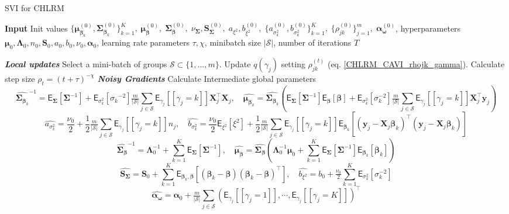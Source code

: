 \begin{algorithm}[H]
\scriptsize 
\caption{SVI for CHLRM}
\label{SVI_CHLRM_alg}
\begin{algorithmic}
\State \textbf{Input} Init values $
\{\bm{\mu}_{\bm{\beta}_k}^{(0)},\bm{\Sigma}_{\bm{\beta}_k}^{(0)}\}_{k=1}^K,\;
\bm{\mu}_{\bm{\beta}}^{(0)},\;\bm{\Sigma}_{\bm{\beta}}^{(0)},\;
\nu_{\bm{\Sigma}},\bm{S}_{\bm{\Sigma}}^{(0)},\;
a_{\xi^2}, b_{\xi^2}^{(0)},\;
\{a_{\sigma_k^2}^{(0)}, b_{\sigma_k^2}^{(0)}\}_{k=1}^K,\;
\{\rho_{jk}^{(0)}\}_{j=1}^m,\;
\bm{\alpha}^{(0)}_{\bm{\omega}}$, hyperparameters $\bm{\mu}_0,\bm{\Lambda}_0,n_0,\bm{S}_0,a_0,b_0,\nu_0,\bm{\alpha}_0$, learning rate parameters $\tau,\chi$, minibatch size $|\mathcal{S}|$, number of iterations $T$

\State \textbf{\textit{Local updates}}
  \State Select a mini-batch of groups $\mathcal{S} \subset \{1,\dots,m\}$.
    \State Update $q(\gamma_j)$ setting $\rho_{jk}^{(t)}$ (eq. \ref{CHLRM_CAVI_rhojk_gamma}).
  \EndFor
  \State  Calculate step size  $\rho_t = (t+\tau)^{-\chi}$
  \State \textbf{\textit{Noisy Gradients}}
  \State Calculate Intermediate global parameters
  $$
    \hat{\bm{\Sigma}_{\bm{\beta}_k}}^{-1} =  \mathsf{E}_{\bm{\Sigma}}\left[\bm{\Sigma}^{-1}\right]+\mathsf{E}_{\sigma^2_k}\left[{\sigma_k}^{-2}\right] \tfrac{m}{|\mathcal{S}|}\sum_{j \in \mathcal{S}} \mathsf{E}_{\gamma_j}\left[[\gamma_j=k]\right]\bm{X}_{j}^\top \bm{X}_{j}
  ,\quad
  \hat{\bm{\mu}_{\bm{\beta}_k}} =\hat{\bm{\Sigma}_{\bm{\beta}_k}}\left(\mathsf{E}_{\bm{\Sigma}}[\bm{\Sigma}^{-1}]\mathsf{E}_{\bm\beta}[\bm\beta]+\mathsf{E}_{\sigma_k^2}[\sigma_k^{-2}]\tfrac{m}{|\mathcal{S}|}\sum_{j \in \mathcal{S}}\mathsf{E}_{\gamma_j}[[\gamma_j=k]]\bm X_j^\top\bm y_j\right)
  $$
    $$
    \hat{a_{\sigma^2_k}} =  \frac{\nu_0}{2} + \frac{1}{2}\tfrac{m}{|\mathcal{S}|}\sum_{j \in \mathcal{S}}\mathsf{E}_{\gamma_j}\left[[\gamma_j=k]\right]n_j
  ,\quad
  \hat{b_{\sigma_k^2}} =\frac{ \nu_0 }{2}\mathsf{E}_{\xi^2}\left[\xi^2\right] +  \frac{1}{2}\tfrac{m}{|\mathcal{S}|}\sum_{j \in \mathcal{S}}\mathsf{E}_{\gamma_j}\left[[\gamma_j=k]\right]\mathsf{E}_{\bm{\beta}_k}\left[\left(\bm{y}_{j} - \bm{X}_{j} \bm{\beta}_k\right)^\top\left(\bm{y}_{j} - \bm{X}_{j} \bm{\beta}_k\right)\right]
  $$
    $$
    \hat{\bm{\Sigma}_{\bm{\beta}}}^{-1} = \bm{\Lambda}_0^{-1} + \sum_{k=1}^K 
  \mathsf{E}_{\bm{\Sigma}}\left[\bm{\Sigma}^{-1}\right]
  ,\quad
  \hat{\bm{\mu}_{\bm{\beta}}} =\hat{\bm{\Sigma}_{\bm{\beta}}}\left( \bm{\Lambda}_0^{-1} \bm{\mu}_0 +\sum_{k=1}^K  \mathsf{E}_{\bm{\Sigma}}\left[\bm{\Sigma}^{-1}\right] \mathsf{E}_{\bm{\beta}_k}\!\left[\bm{\beta}_k \right]\right)
  $$
  $$
  \hat{\bm{S}_{\bm{\Sigma}}} = \bm{S}_0+ \sum_{k=1}^K  \mathsf{E}_{\bm{\beta}_k,\bm{\beta}}\!\left[(\bm{\beta}_k-\bm{\beta})(\bm{\beta}_k-\bm{\beta})^\top\right],
  \quad 
  \hat{b_{\xi^2}} =b_0 + \tfrac{\nu_0}{2} \sum_{k=1}^K 
  \mathsf{E}_{\sigma_k^2}\left[\sigma_k^{-2}\right]
  $$
  $$
  \hat{\bm{\alpha}_{\bm{\omega}}} = \bm{\alpha}_0+\tfrac{m}{|\mathcal{S}|}\sum_{j \in \mathcal{S}}\left(\mathsf{E}_{\gamma_j}\left[[\gamma_j=1]\right],\cdots,\mathsf{E}_{\gamma_j}\left[[\gamma_j=K]\right]\right)^\top
  $$


\end{algorithmic}
\end{algorithm}
